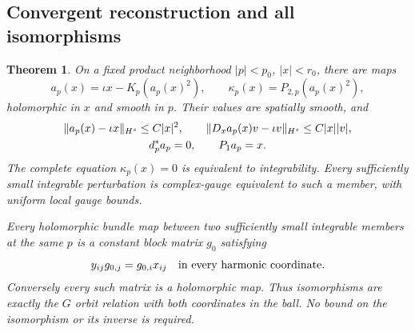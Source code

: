 \documentclass[11pt]{amsart}
\newtheorem{theorem}{Theorem}[section]
\theoremstyle{definition}
\theoremstyle{remark}
\begin{document}
\subsection{Convergent reconstruction and all isomorphisms}
\begin{theorem}\label{thm:complete-model}
On a fixed product neighborhood $|p|<p_0$, $|x|<r_0$, there are maps
\begin{equation}\label{eq:reconstruction}
 a_p(x)=\iota x-K_p(a_p(x)^2),\qquad
 \kappa_p(x)=P_{2,p}(a_p(x)^2),
\end{equation}
holomorphic in $x$ and smooth in $p$. Their values are spatially smooth,
and
\begin{gather}
 \|a_p(x)-\iota x\|_{H^s}\le C|x|^2,\qquad
 \|D_xa_p(x)v-\iota v\|_{H^s}\le C|x||v|,\label{eq:reconstruction-bounds}\\
 d_p^*a_p=0,\qquad P_1a_p=x.\notag
\end{gather}
The complete equation $\kappa_p(x)=0$ is equivalent to integrability.
Every sufficiently small integrable perturbation is complex-gauge
equivalent to such a member, with uniform local gauge bounds.

Every holomorphic bundle map between two sufficiently small integrable
members at the same $p$ is a constant block matrix $g_0$ satisfying
\begin{equation}\label{eq:intertwiner}
 y_{ij}g_{0,j}=g_{0,i}x_{ij}
 \quad\hbox{in every harmonic coordinate}.
\end{equation}
Conversely every such matrix is a holomorphic map. Thus isomorphisms are
exactly the $G$ orbit relation with both coordinates in the ball.
No bound on the isomorphism or its inverse is required.
\end{theorem}
\end{document}
